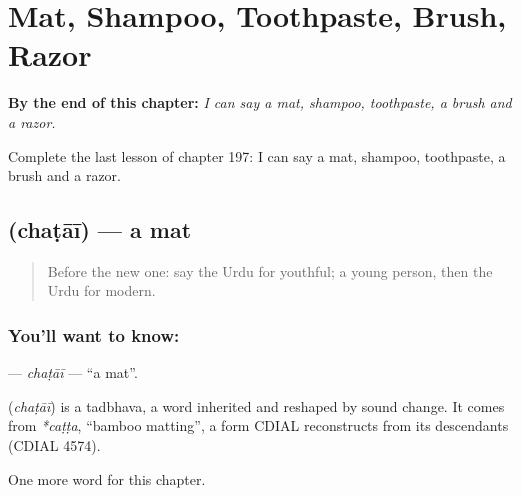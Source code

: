 
\chapter{Mat, Shampoo, Toothpaste, Brush, Razor}
\label{ch:ur-mat-shampoo-toothpaste-brush-razor}

\begin{chapteropening}
\textbf{By the end of this chapter:} \emph{I can say a mat, shampoo, toothpaste, a brush and a razor.}

Complete the last lesson of chapter 197: I can say a mat, shampoo, toothpaste, a brush and a razor.
\end{chapteropening}

\section[\texorpdfstring{\ur{چٹائی} (chaṭāī)}{چٹائی (chaṭāī)}]{ (chaṭāī) — a mat}

\label{lesson:UR-C197-chatai}



\begin{quote}
Before the new one: say the Urdu for youthful; a young person, then the Urdu for modern.
\end{quote}

\subsection*{You'll want to know: }
\textbf{} — \emph{chaṭāī} — \textquotedblleft{}a mat\textquotedblright{}.

\begin{cousinweb}
\textbf{} (\emph{chaṭāī}) is a tadbhava, a word inherited and reshaped by sound change. It comes from \emph{*caṭṭa}, \textquotedblleft{}bamboo matting\textquotedblright{}, a form CDIAL reconstructs from its descendants (CDIAL 4574).
\end{cousinweb}

\begin{grammarlens}[title={What you've built}]
One more word for this chapter.
\end{grammarlens}

